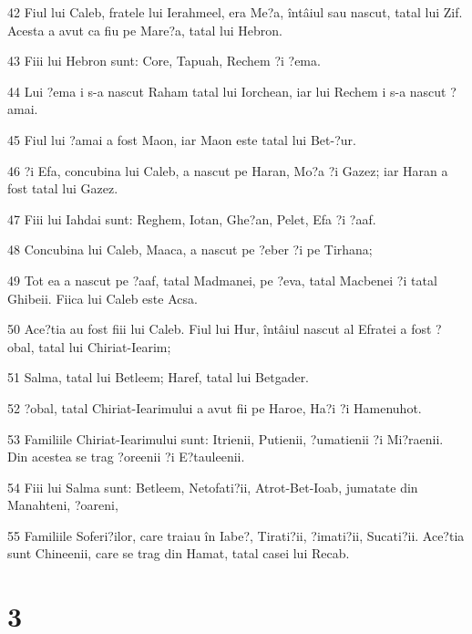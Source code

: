 \par 42 Fiul lui Caleb, fratele lui Ierahmeel, era Me?a, întâiul sau nascut, tatal lui Zif. Acesta a avut ca fiu pe Mare?a, tatal lui Hebron.
\par 43 Fiii lui Hebron sunt: Core, Tapuah, Rechem ?i ?ema.
\par 44 Lui ?ema i s-a nascut Raham tatal lui Iorchean, iar lui Rechem i s-a nascut ?amai.
\par 45 Fiul lui ?amai a fost Maon, iar Maon este tatal lui Bet-?ur.
\par 46 ?i Efa, concubina lui Caleb, a nascut pe Haran, Mo?a ?i Gazez; iar Haran a fost tatal lui Gazez.
\par 47 Fiii lui Iahdai sunt: Reghem, Iotan, Ghe?an, Pelet, Efa ?i ?aaf.
\par 48 Concubina lui Caleb, Maaca, a nascut pe ?eber ?i pe Tirhana;
\par 49 Tot ea a nascut pe ?aaf, tatal Madmanei, pe ?eva, tatal Macbenei ?i tatal Ghibeii. Fiica lui Caleb este Acsa.
\par 50 Ace?tia au fost fiii lui Caleb. Fiul lui Hur, întâiul nascut al Efratei a fost ?obal, tatal lui Chiriat-Iearim;
\par 51 Salma, tatal lui Betleem; Haref, tatal lui Betgader.
\par 52 ?obal, tatal Chiriat-Iearimului a avut fii pe Haroe, Ha?i ?i Hamenuhot.
\par 53 Familiile Chiriat-Iearimului sunt: Itrienii, Putienii, ?umatienii ?i Mi?raenii. Din acestea se trag ?oreenii ?i E?tauleenii.
\par 54 Fiii lui Salma sunt: Betleem, Netofati?ii, Atrot-Bet-Ioab, jumatate din Manahteni, ?oareni,
\par 55 Familiile Soferi?ilor, care traiau în Iabe?, Tirati?ii, ?imati?ii, Sucati?ii. Ace?tia sunt Chineenii, care se trag din Hamat, tatal casei lui Recab.

\chapter{3}

